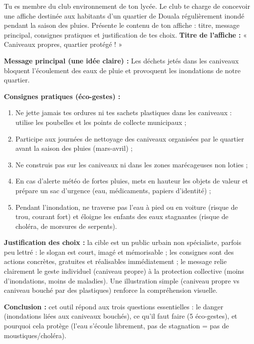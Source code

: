 \documentclass[11pt]{article}
\begin{document}
\begin{exoresolu}
Tu es membre du club environnement de ton lycée. Le club te charge de concevoir une affiche destinée aux habitants d'un quartier de Douala régulièrement inondé pendant la saison des pluies. Présente le contenu de ton affiche : titre, message principal, consignes pratiques et justification de tes choix.
\tcblower
\textbf{Titre de l'affiche :} « Caniveaux propres, quartier protégé ! »

\textbf{Message principal (une idée claire) :} Les déchets jetés dans les caniveaux bloquent l'écoulement des eaux de pluie et provoquent les inondations de notre quartier.

\textbf{Consignes pratiques (éco-gestes) :}
\begin{enumerate}
\item Ne jette jamais tes ordures ni tes sachets plastiques dans les caniveaux : utilise les poubelles et les points de collecte municipaux ;
\item Participe aux journées de nettoyage des caniveaux organisées par le quartier avant la saison des pluies (mars-avril) ;
\item Ne construis pas sur les caniveaux ni dans les zones marécageuses non loties ;
\item En cas d'alerte météo de fortes pluies, mets en hauteur les objets de valeur et prépare un sac d'urgence (eau, médicaments, papiers d'identité) ;
\item Pendant l'inondation, ne traverse pas l'eau à pied ou en voiture (risque de trou, courant fort) et éloigne les enfants des eaux stagnantes (risque de choléra, de morsures de serpents).
\end{enumerate}

\textbf{Justification des choix :} la cible est un public urbain non spécialiste, parfois peu lettré : le slogan est court, imagé et mémorisable ; les consignes sont des actions concrètes, gratuites et réalisables immédiatement ; le message relie clairement le geste individuel (caniveau propre) à la protection collective (moins d'inondations, moins de maladies). Une illustration simple (caniveau propre vs caniveau bouché par des plastiques) renforce la compréhension visuelle.

\textbf{Conclusion :} cet outil répond aux trois questions essentielles : le danger (inondations liées aux caniveaux bouchés), ce qu'il faut faire (5 éco-gestes), et pourquoi cela protège (l'eau s'écoule librement, pas de stagnation = pas de moustiques/choléra).
\end{exoresolu}
\end{document}
